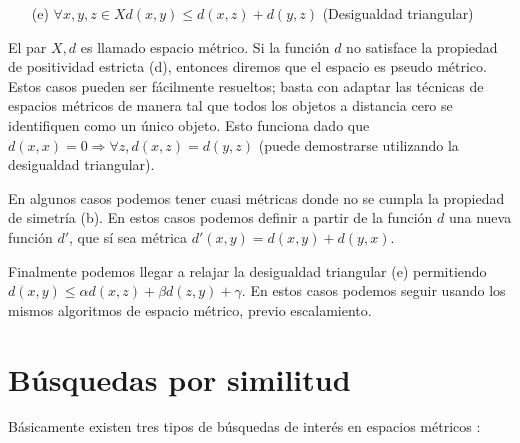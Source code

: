 \begin{enumerate}
\item  [(e)] $\forall x,y,z \in X d(x,y) \leq d(x,z) + d(y,z)$ (Desigualdad triangular)
\end{enumerate}

El par $X,d$ es llamado espacio m\'etrico. Si la funci\'on $d$ no satisface la propiedad de 
positividad estricta (d), entonces diremos que el espacio es pseudo m\'etrico. Estos casos pueden 
ser f\'acilmente resueltos; basta con adaptar las t\'ecnicas de espacios m\'etricos de manera tal 
que todos los objetos a distancia cero se identifiquen como un \'unico objeto. Esto funciona dado 
que $d(x,x) = 0 \Rightarrow \forall z, d(x,z) = d(y,z)$ (puede demostrarse utilizando la 
desigualdad triangular).

En algunos casos podemos tener cuasi m\'etricas donde no se cumpla la propiedad de simetr\'ia (b). 
En estos casos podemos definir a partir de la funci\'on $d$ una nueva funci\'on $d'$, que s\'i sea 
m\'etrica $d'(x,y) = d(x,y) + d(y,x)$.

Finalmente podemos llegar a relajar la desigualdad triangular (e) permitiendo $d(x,y)  \leq \alpha 
d(x,z) +  \beta d(z,y) + \gamma$. En estos casos podemos seguir usando los mismos algoritmos de 
espacio m\'etrico, previo escalamiento.


\section{B\'usquedas por similitud}
B\'asicamente existen tres tipos de b\'usquedas de inter\'es en
espacios m\'etricos \cite{oursurvey}:

